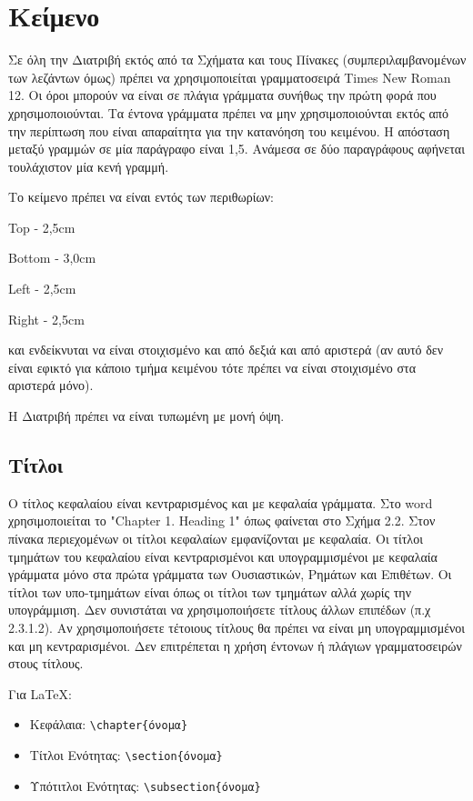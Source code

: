 \section{Κείμενο}
\label{sec:2.3}

Σε όλη την Διατριβή εκτός από τα Σχήματα και τους Πίνακες
(συμπεριλαμβανομένων των λεζάντων όμως) πρέπει να χρησιμοποιείται
γραμματοσειρά Times New Roman 12. Οι όροι μπορούν να είναι σε
πλάγια γράμματα συνήθως την πρώτη φορά που χρησιμοποιούνται. Τα
έντονα γράμματα πρέπει να μην χρησιμοποιούνται εκτός από την
περίπτωση που είναι απαραίτητα για την κατανόηση του κειμένου. Η
απόσταση μεταξύ γραμμών σε μία παράγραφο είναι 1,5. Ανάμεσα σε δύο
παραγράφους αφήνεται τουλάχιστον μία κενή γραμμή.

\y Το κείμενο πρέπει να είναι εντός των περιθωρίων:

\chl Top - 2,5cm

\chl Bottom - 3,0cm

\chl Left - 2,5cm

\chl Right - 2,5cm

\chl και ενδείκνυται να είναι στοιχισμένο και από δεξιά και από
αριστερά (αν αυτό δεν είναι εφικτό για κάποιο τμήμα κειμένου τότε
πρέπει να είναι στοιχισμένο στα αριστερά μόνο).

Η Διατριβή πρέπει να είναι τυπωμένη με μονή όψη.


\subsection{Τίτλοι} \label{sec:2.3.1}

Ο τίτλος κεφαλαίου είναι κεντραρισμένος και με κεφαλαία γράμματα.
Στο word χρησιμοποιείται το "Chapter 1. Heading 1" όπως φαίνεται
στο Σχήμα 2.2.  Στον πίνακα περιεχομένων οι τίτλοι κεφαλαίων
εμφανίζονται με κεφαλαία. Οι τίτλοι τμημάτων του κεφαλαίου είναι
κεντραρισμένοι και υπογραμμισμένοι με κεφαλαία γράμματα μόνο στα
πρώτα γράμματα των Ουσιαστικών, Ρημάτων και Επιθέτων. Οι τίτλοι
των υπο-τμημάτων είναι όπως οι τίτλοι των τμημάτων αλλά χωρίς την
υπογράμμιση. Δεν συνιστάται να χρησιμοποιήσετε τίτλους άλλων
επιπέδων (π.χ 2.3.1.2). Αν χρησιμοποιήσετε τέτοιους τίτλους θα
πρέπει να είναι μη υπογραμμισμένοι και μη κεντραρισμένοι. Δεν
επιτρέπεται η χρήση έντονων ή πλάγιων γραμματοσειρών στους
τίτλους.

\y Για \LaTeX:

\begin{itemize}
\item Κεφάλαια: \verb"\chapter{όνομα}"
\item Τίτλοι Ενότητας: \verb"\section{όνομα}"
\item Υπότιτλοι Ενότητας: \verb"\subsection{όνομα}"
\end{itemize}

